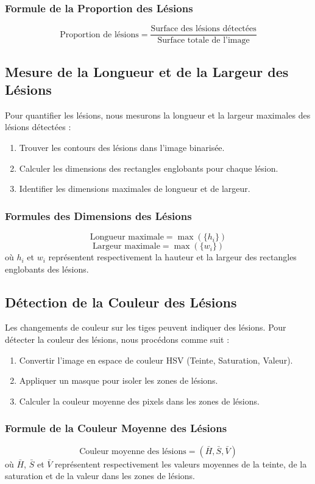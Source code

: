 \documentclass{article}
\begin{document}
	\subsubsection*{Formule de la Proportion des Lésions}
	\[
	\text{Proportion de lésions} = \frac{\text{Surface des lésions détectées}}{\text{Surface totale de l'image}}
	\]
	
	\subsection*{Mesure de la Longueur et de la Largeur des Lésions}
	
	Pour quantifier les lésions, nous mesurons la longueur et la largeur maximales des lésions détectées :
	\begin{enumerate}
		\item Trouver les contours des lésions dans l'image binarisée.
		\item Calculer les dimensions des rectangles englobants pour chaque lésion.
		\item Identifier les dimensions maximales de longueur et de largeur.
	\end{enumerate}
	
	\subsubsection*{Formules des Dimensions des Lésions}
	\[
	\text{Longueur maximale} = \max(\{h_i\})
	\]
	\[
	\text{Largeur maximale} = \max(\{w_i\})
	\]
	où \( h_i \) et \( w_i \) représentent respectivement la hauteur et la largeur des rectangles englobants des lésions.
	
	\subsection*{Détection de la Couleur des Lésions}
	
	Les changements de couleur sur les tiges peuvent indiquer des lésions. Pour détecter la couleur des lésions, nous procédons comme suit :
	\begin{enumerate}
		\item Convertir l'image en espace de couleur HSV (Teinte, Saturation, Valeur).
		\item Appliquer un masque pour isoler les zones de lésions.
		\item Calculer la couleur moyenne des pixels dans les zones de lésions.
	\end{enumerate}
	
	\subsubsection*{Formule de la Couleur Moyenne des Lésions}
	\[
	\text{Couleur moyenne des lésions} = \left( \bar{H}, \bar{S}, \bar{V} \right)
	\]
	où \( \bar{H} \), \( \bar{S} \) et \( \bar{V} \) représentent respectivement les valeurs moyennes de la teinte, de la saturation et de la valeur dans les zones de lésions.
	
\end{document}
